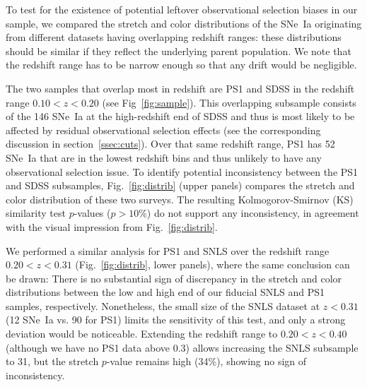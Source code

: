 \documentclass[]{aa}
\begin{document}
To test for the existence of potential leftover observational selection biases
in our sample, we compared the stretch and color distributions of the SNe~Ia
originating from different datasets having overlapping redshift ranges: these
distributions should be similar if they reflect the underlying parent
population. We note that the redshift range has to be narrow enough so that any
drift would be negligible.

The two samples that overlap most in redshift are PS1 and SDSS in the
redshift range $0.10 < z < 0.20$ (see Fig~\ref{fig:sample}). This overlapping
subsample consists of the 146 SNe~Ia at the high-redshift end of SDSS and thus
is most likely to be affected by residual observational selection effects (see
the corresponding discussion in section~\ref{ssec:cuts}). Over that same
redshift range, PS1 has 52 SNe~Ia that are in the lowest redshift bins and
thus unlikely to have any observational selection issue. To identify potential
inconsistency between the PS1 and SDSS subsamples, Fig.~\ref{fig:distrib} (upper
panels) compares the stretch and color distribution of these two surveys. The
resulting Kolmogorov-Smirnov (KS) similarity test $p$-values ($p >10\%$) do not
support any inconsistency, in agreement with the visual impression from
Fig.~\ref{fig:distrib}.

We performed a similar analysis for PS1 and SNLS over the redshift range $0.20 < z
< 0.31$ (Fig.~\ref{fig:distrib}, lower panels), where the same conclusion can be
drawn: There is no substantial sign of discrepancy in the stretch and color
distributions between the low and high end of our fiducial SNLS and PS1
samples, respectively. Nonetheless, the small size of the SNLS dataset at $z <
0.31$ (12 SNe~Ia vs. 90 for PS1) limits the sensitivity of this test, and only a
strong deviation would be noticeable. Extending the redshift range to $0.20 < z
< 0.40$ (although we have no PS1 data above 0.3) allows increasing the SNLS
subsample to 31, but the stretch $p$-value remains high (34\%), showing no sign
of inconsistency.
\end{document}
